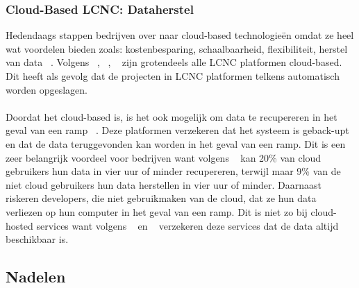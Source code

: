 \subsubsection{Cloud-Based LCNC: Dataherstel}
\label{subsec:cloud-based-lcnc}
Hedendaags stappen bedrijven over naar cloud-based technologieën omdat ze heel wat voordelen bieden zoals: 
kostenbesparing, schaalbaarheid, flexibiliteit, herstel van data ~\autocite{Sufi_2023}. 
Volgens ~\textcites{Sufi_2023}, ~\textcite{Talesra_2021}, ~\textcite{Hintsch2021} zijn grotendeels alle LCNC platformen cloud-based. Dit heeft als gevolg dat de projecten in LCNC platformen telkens automatisch worden opgeslagen.
\\
\\
Doordat het cloud-based is, is het ook mogelijk om data te recupereren in het geval van een ramp ~\autocite{Sufi_2023}. 
Deze platformen verzekeren dat het systeem is geback-upt en dat de data teruggevonden kan worden in het geval van een ramp. 
Dit is een zeer belangrijk voordeel voor bedrijven want volgens ~\textcite{Sufi_2023} kan 20\% van cloud gebruikers hun data in vier uur of minder recupereren, 
terwijl maar 9\% van de niet cloud gebruikers hun data herstellen in vier uur of minder. Daarnaast riskeren developers, die niet gebruikmaken van de cloud, 
dat ze hun data verliezen op hun computer in het geval van een ramp. 
Dit is niet zo bij cloud-hosted services want volgens ~\textcite{Sufi_2023} en ~\textcite{Chou_2015} verzekeren deze services dat de data altijd beschikbaar is.
\subsection{Nadelen}%
\label{subsec:nadelen}
